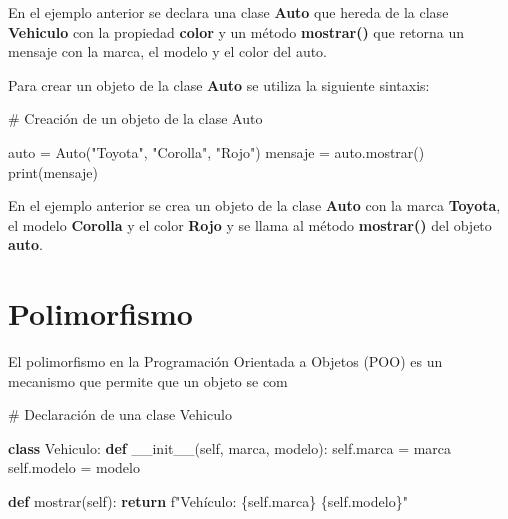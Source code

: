 \documentclass[
  a4paper,
  DIV=11,
  numbers=noendperiod,
  onepage,
  openany]{scrreprt}
\newenvironment{Shaded}{\begin{snugshade}}{\end{snugshade}}
\newcommand{\BuiltInTok}[1]{\textcolor[rgb]{0.00,0.23,0.31}{#1}}
\newcommand{\CommentTok}[1]{\textcolor[rgb]{0.37,0.37,0.37}{#1}}
\newcommand{\ControlFlowTok}[1]{\textcolor[rgb]{0.00,0.23,0.31}{\textbf{#1}}}
\newcommand{\FunctionTok}[1]{\textcolor[rgb]{0.28,0.35,0.67}{#1}}
\newcommand{\KeywordTok}[1]{\textcolor[rgb]{0.00,0.23,0.31}{\textbf{#1}}}
\newcommand{\NormalTok}[1]{\textcolor[rgb]{0.00,0.23,0.31}{#1}}
\newcommand{\OperatorTok}[1]{\textcolor[rgb]{0.37,0.37,0.37}{#1}}
\newcommand{\SpecialCharTok}[1]{\textcolor[rgb]{0.37,0.37,0.37}{#1}}
\newcommand{\SpecialStringTok}[1]{\textcolor[rgb]{0.13,0.47,0.30}{#1}}
\newcommand{\StringTok}[1]{\textcolor[rgb]{0.13,0.47,0.30}{#1}}
\newcommand{\VariableTok}[1]{\textcolor[rgb]{0.07,0.07,0.07}{#1}}
\begin{document}
En el ejemplo anterior se declara una clase \textbf{Auto} que hereda de
la clase \textbf{Vehiculo} con la propiedad \textbf{color} y un método
\textbf{mostrar()} que retorna un mensaje con la marca, el modelo y el
color del auto.

Para crear un objeto de la clase \textbf{Auto} se utiliza la siguiente
sintaxis:

\begin{Shaded}
\begin{Highlighting}[]
\CommentTok{\# Creación de un objeto de la clase Auto}

\NormalTok{auto }\OperatorTok{=}\NormalTok{ Auto(}\StringTok{"Toyota"}\NormalTok{, }\StringTok{"Corolla"}\NormalTok{, }\StringTok{"Rojo"}\NormalTok{)}
\NormalTok{mensaje }\OperatorTok{=}\NormalTok{ auto.mostrar()}
\BuiltInTok{print}\NormalTok{(mensaje)}
\end{Highlighting}
\end{Shaded}

En el ejemplo anterior se crea un objeto de la clase \textbf{Auto} con
la marca \textbf{Toyota}, el modelo \textbf{Corolla} y el color
\textbf{Rojo} y se llama al método \textbf{mostrar()} del objeto
\textbf{auto}.

\section{Polimorfismo}\label{polimorfismo}

El polimorfismo en la Programación Orientada a Objetos (POO) es un
mecanismo que permite que un objeto se com

\begin{Shaded}
\begin{Highlighting}[]
\CommentTok{\# Declaración de una clase Vehiculo}

\KeywordTok{class}\NormalTok{ Vehiculo:}
    \KeywordTok{def} \FunctionTok{\_\_init\_\_}\NormalTok{(}\VariableTok{self}\NormalTok{, marca, modelo):}
        \VariableTok{self}\NormalTok{.marca }\OperatorTok{=}\NormalTok{ marca}
        \VariableTok{self}\NormalTok{.modelo }\OperatorTok{=}\NormalTok{ modelo}

    \KeywordTok{def}\NormalTok{ mostrar(}\VariableTok{self}\NormalTok{):}
        \ControlFlowTok{return} \SpecialStringTok{f"Vehículo: }\SpecialCharTok{\{}\VariableTok{self}\SpecialCharTok{.}\NormalTok{marca}\SpecialCharTok{\}}\SpecialStringTok{ }\SpecialCharTok{\{}\VariableTok{self}\SpecialCharTok{.}\NormalTok{modelo}\SpecialCharTok{\}}\SpecialStringTok{"}
\end{Highlighting}
\end{Shaded}
\end{document}
